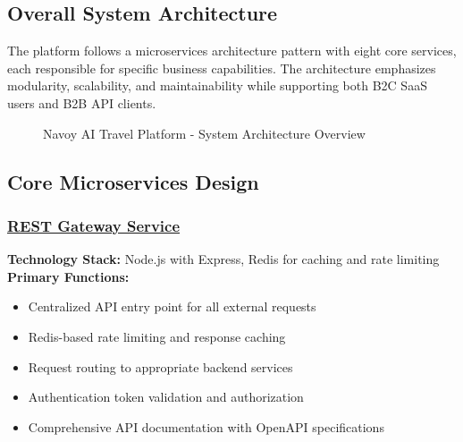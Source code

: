\subsection{Overall System Architecture}
The platform follows a microservices architecture pattern with eight core services, each responsible for specific business capabilities. The architecture emphasizes modularity, scalability, and maintainability while supporting both B2C SaaS users and B2B API clients.

\begin{figure}[H]
    \centering
    \caption{Navoy AI Travel Platform - System Architecture Overview}
    \label{fig:system-architecture}
\end{figure}

\subsection{Core Microservices Design}

\subsubsection*{\underline{REST Gateway Service}}
\textbf{Technology Stack:} Node.js with Express, Redis for caching and rate limiting\\
\textbf{Primary Functions:}
\begin{itemize}
    \item Centralized API entry point for all external requests
    \item Redis-based rate limiting and response caching
    \item Request routing to appropriate backend services
    \item Authentication token validation and authorization
    \item Comprehensive API documentation with OpenAPI specifications
\end{itemize}

